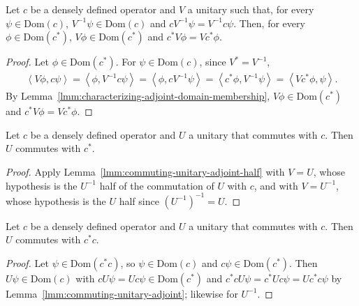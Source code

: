 \begin{lemma}
    \label{lmm:commuting-unitary-adjoint-half}
    \leanok
    Let $c$ be a densely defined operator and $V$ a unitary such that, for every $\psi \in \text{Dom}(c)$, $V^{-1}\psi \in \text{Dom}(c)$ and $cV^{-1}\psi = V^{-1}c\psi$. Then, for every $\phi \in \text{Dom}(c^*)$, $V\phi \in \text{Dom}(c^*)$ and $c^*V\phi = Vc^*\phi$.
\end{lemma}
\begin{proof}
    \leanok
    Let $\phi \in \text{Dom}(c^*)$. For $\psi \in \text{Dom}(c)$, since $V^* = V^{-1}$,
    \begin{align}
        \left< V\phi, c\psi \right> = \left< \phi, V^{-1}c\psi \right> = \left< \phi, cV^{-1}\psi \right> = \left< c^*\phi, V^{-1}\psi \right> = \left< Vc^*\phi, \psi \right>.
    \end{align}
    By Lemma~\ref{lmm:characterizing-adjoint-domain-membership}, $V\phi \in \text{Dom}(c^*)$ and $c^*V\phi = Vc^*\phi$.
\end{proof}

\begin{lemma}
    \label{lmm:commuting-unitary-adjoint}
    \leanok
    Let $c$ be a densely defined operator and $U$ a unitary that commutes with $c$. Then $U$ commutes with $c^*$.
\end{lemma}
\begin{proof}
    \leanok
    Apply Lemma~\ref{lmm:commuting-unitary-adjoint-half} with $V = U$, whose hypothesis is the $U^{-1}$ half of the commutation of $U$ with $c$, and with $V = U^{-1}$, whose hypothesis is the $U$ half since $(U^{-1})^{-1} = U$.
\end{proof}

\begin{lemma}
    \label{lmm:commuting-unitary-adjoint-product}
    \leanok
    Let $c$ be a densely defined operator and $U$ a unitary that commutes with $c$. Then $U$ commutes with $c^*c$.
\end{lemma}
\begin{proof}
    \leanok
    Let $\psi \in \text{Dom}(c^*c)$, so $\psi \in \text{Dom}(c)$ and $c\psi \in \text{Dom}(c^*)$. Then $U\psi \in \text{Dom}(c)$ with $cU\psi = Uc\psi \in \text{Dom}(c^*)$ and $c^*cU\psi = c^*Uc\psi = Uc^*c\psi$ by Lemma~\ref{lmm:commuting-unitary-adjoint}; likewise for $U^{-1}$.
\end{proof}

